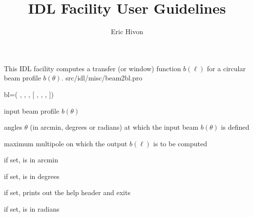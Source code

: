 

\sloppy

\title{\healpix IDL Facility User Guidelines}
 \section[beam2bl]{ }
\label{idl:beam2bl}
\author{Eric Hivon}

\begin{facility}
{This IDL facility computes a transfer (or window) function $b(\ell)$ for a circular beam profile $b(\theta)$.
}
{src/idl/misc/beam2bl.pro}
\end{facility}

\begin{IDLformat}
{%
{bl}=\thedocid(
, 
, 
, 
[%
 ,
, 
, 
%
])}
\end{IDLformat}

\begin{qualifiers}
  \begin{qulist}{} %
    \item[beam] %
      input beam profile $b(\theta)$ 
    \item[theta] %
    angles $\theta$ (in arcmin, degrees or radians) 
  at which the input beam $b(\theta)$ is defined
    \item[lmax] %
    maximum multipole on which the output $b(\ell)$ is to be computed
  \end{qulist}
\end{qualifiers}

\begin{keywords}
  \begin{kwlist}{} %
    \item[/ARCMIN] %
	if set,  is in arcmin
    \item[/DEGREES] %
	if set,  is in degrees
    \item[/HELP] %
	if set, prints out the help header and exits
    \item[/RADIANS] %
	if set,  is in radians
  \end{kwlist}
\end{keywords}  

